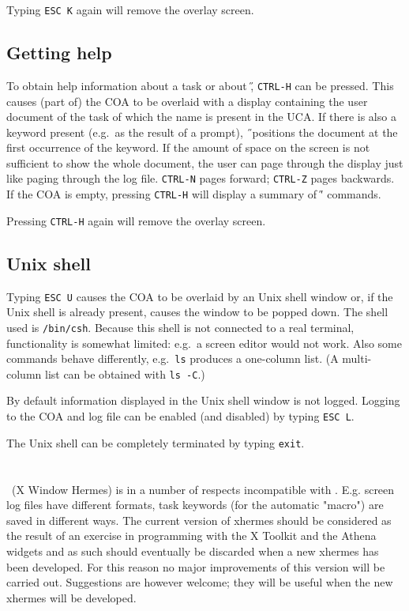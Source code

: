 Typing {\tt ESC K} again will remove the overlay screen.

\subsection*{Getting help}
To obtain help information about a task or about \H, {\tt CTRL-H} can be 
pressed.
This causes (part of) the COA to be overlaid with a display containing the
user document of the task of which the name is present in the UCA.
If there is also a keyword present (e.g.\ as the result of a prompt), 
\H\ positions the document at the first occurrence of the keyword.
If the amount of space on the screen is not sufficient to show the whole
document,
the user can page through the display just like paging through the log file.
{\tt CTRL-N} pages forward; {\tt CTRL-Z} pages backwards.
If the COA is empty, pressing {\tt CTRL-H} will display a summary of \H'
commands.

Pressing {\tt CTRL-H} again will remove the overlay screen.

\subsection{Unix shell}
Typing {\tt ESC U} causes the COA to be overlaid by an Unix shell window or,
if the Unix shell is already present, causes the window to be popped down.
The shell used is {\tt /bin/csh}.
Because this shell is not connected to
a real terminal, functionality is somewhat limited: e.g.\ a screen editor
would not work.
Also some commands behave differently, e.g.\ {\tt ls} produces a one-column
list. (A multi-column list can be obtained with {\tt ls -C}.)

By default information displayed in the Unix shell window is not logged.
Logging to the COA and log file can be enabled (and disabled) by typing
{\tt ESC L}.

The Unix shell can be completely terminated by typing {\tt exit}.

\section{\xH}
\xH\ (X Window Hermes) is in a number of respects incompatible with 
\tH. E.g. screen log files have different formats, task
keywords (for the automatic "macro") are saved in different ways.
The current version of xhermes should be considered as the result
of an exercise in programming with the X Toolkit and the
Athena widgets and as such should eventually be discarded when
a new xhermes has been developed. For this reason no major
improvements of this version will be carried out.
Suggestions are however welcome; they will be useful when
the new xhermes will be developed.


